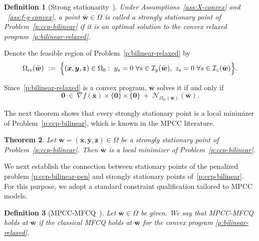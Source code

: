 \documentclass[11pt]{article}
\newtheorem{theorem}{Theorem}[section]
\newtheorem{definition}[theorem]{Definition}
\def\bs{\boldsymbol}
\def\I{\mathcal{I}}
\def\N{\mathcal{N}}
\begin{document}
\begin{definition}[Strong stationarity~\cite{jara2018study}] 
Under Assumptions~\ref{ass:X-convex} and ~\ref{ass:f-g-convex}, a point $\bar{\bs{w}}\in\Omega$ is called a \emph{strongly stationary point} of Problem~\eqref{p:ccp-bilinear} if it is an optimal solution to the convex relaxed program~\eqref{p:bilinear-relaxed}.
\end{definition}

Denote the feasible region of Problem~\eqref{p:bilinear-relaxed} by
\begin{equation*}
\Omega_{\mathrm{re}}(\bar{\bs{w}})\ :=\ \Bigl\{(\bs{x},\bs{y},\bs{z})\in\Omega_0:\ 
y_s=0\ \forall s\in \I_y(\bar{\bs{w}}),\ z_s=0\ \forall s\in \I_z(\bar{\bs{w}})\Bigr\}.
\end{equation*}

Since~\eqref{p:bilinear-relaxed} is a convex program, $\bar{\bs{w}}$ solves it if and only if
\begin{equation}\label{eq:relaxed-stationarity-nc}
\bs{0}\ \in\ \nabla f(\bar{\bs{x}})\times\{\bs{0}\}\times\{\bs{0}\}\ +\ \N_{\Omega_{\mathrm{re}}(\bar{\bs{w}})}(\bar{\bs{w}}).
\end{equation} 

The next theorem shows that every strongly stationary point is a local minimizer of Problem~\eqref{p:ccp-bilinear}, which is known in the MPCC literature.

\begin{theorem}{\cite[proposition~1]{jara2018study}}
Let $\bar{\bs{w}}=(\bar{\bs{x}},\bar{\bs{y}},\bar{\bs{z}})\in\Omega$ be a strongly stationary point
of Problem~\eqref{p:ccp-bilinear}. Then $\bar{\bs{w}}$ is a local minimizer of Problem~\eqref{p:ccp-bilinear}.
\end{theorem}

We next establish the connection between stationary points of the penalized problem \eqref{p:ccp-bilinear-pen} and strongly stationary points of~\eqref{p:ccp-bilinear}. For this purpose, we adopt a standard constraint qualification tailored to MPCC models.

\begin{definition}[MPCC-MFCQ~\cite{hoheisel2013theoretical, jara2018study}]
Let $\bar{\bs{w}}\in\Omega$ be given. We say that \emph{MPCC-MFCQ holds at $\bar{\bs{w}}$} if the classical MFCQ holds at $\bar{\bs{w}}$ for the convex program \eqref{p:bilinear-relaxed}.
\end{definition}
\end{document}

